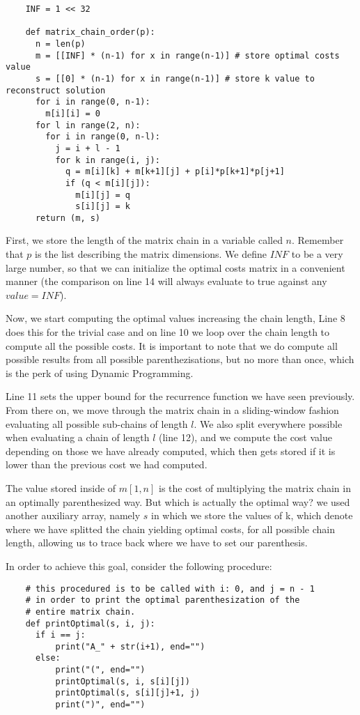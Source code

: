 \begin{verbatim}
    INF = 1 << 32
    
    def matrix_chain_order(p):
      n = len(p)
      m = [[INF] * (n-1) for x in range(n-1)] # store optimal costs value 
      s = [[0] * (n-1) for x in range(n-1)] # store k value to reconstruct solution
      for i in range(0, n-1):
        m[i][i] = 0
      for l in range(2, n):
        for i in range(0, n-l):
          j = i + l - 1
          for k in range(i, j):
            q = m[i][k] + m[k+1][j] + p[i]*p[k+1]*p[j+1]
            if (q < m[i][j]):
              m[i][j] = q
              s[i][j] = k
      return (m, s)
  \end{verbatim}

First, we store the length of the matrix chain in a variable called $n$. Remember that $p$ is the list describing the matrix dimensions.
We define $INF$ to be a very large number, so that we can initialize the optimal costs matrix in a convenient manner 
(the comparison on line 14 will always evaluate to true against any $value = INF$).

Now, we start computing the optimal values increasing the chain length, Line 8 does this for the trivial case and on line 10 we loop over the chain length 
to compute all the possible costs. It is important to note that we do compute all possible results from all possible parenthezisations, but no more than once, 
which is the perk of using Dynamic Programming.

Line 11 sets the upper bound for the recurrence function we have seen previously. From there on, we move through the matrix chain in a sliding-window fashion
evaluating all possible sub-chains of length $l$. We also split everywhere possible when evaluating a chain of length $l$ (line 12), and we compute the cost value depending on 
those we have already computed, which then gets stored if it is lower than the previous cost we had computed.

The value stored inside of $m[1, n]$ is the cost of multiplying the matrix chain in an optimally parenthesized way. But which is actually the optimal way?
we used another auxiliary array, namely $s$ in which we store the values of k, which denote where we have splitted the chain yielding 
optimal costs, for all possible chain length, allowing us to trace back where we have to set our parenthesis.

In order to achieve this goal, consider the following procedure:

\begin{verbatim}
    # this procedured is to be called with i: 0, and j = n - 1
    # in order to print the optimal parenthesization of the 
    # entire matrix chain.
    def printOptimal(s, i, j):
      if i == j:
          print("A_" + str(i+1), end="")
      else:
          print("(", end="")
          printOptimal(s, i, s[i][j])
          printOptimal(s, s[i][j]+1, j)
          print(")", end="")
  \end{verbatim}

